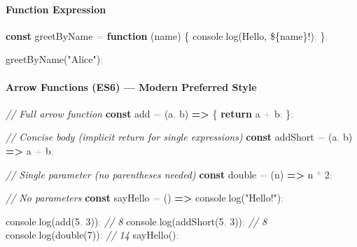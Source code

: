 \documentclass[
  justified,
  openright,
]{tufte-book}
\let\subsection\paragraph
\let\paragraph\paragraph
\newcommand{\KeywordTok}[1]{\textcolor{CodeKeyword}{\textbf{#1}}}  %
\newcommand{\StringTok}[1]{\textcolor{CodeString}{#1}}              %
\newcommand{\CommentTok}[1]{\textcolor{CodeComment}{\textit{#1}}}  %
\newcommand{\CodeNumTok}[1]{\textcolor{CodeNumber}{#1}}             %
\newcommand{\CodeFuncTok}[1]{\textcolor{CodeKeyword}{#1}}           %
\newcommand{\OperatorTok}[1]{\textcolor{DarkGray}{#1}}              %
\newenvironment{Shaded}{%
  \begin{mdframed}[style=TufteCode]%
}{%
  \end{mdframed}%
}
\let\subsection\paragraph
\let\paragraph\paragraph
\begin{document}
\subsection{Function Expression}\label{function-expression}

\begin{Shaded}
\begin{Highlighting}[]
\KeywordTok{const} greetByName \OperatorTok{=} \KeywordTok{function} (name) \{
  console\OperatorTok{.}\CodeFuncTok{log}(\StringTok{\textasciigrave{}Hello, }\StringTok{\$\{}name\StringTok{\}}\StringTok{!\textasciigrave{}})\OperatorTok{;}
\}\OperatorTok{;}
 
\CodeFuncTok{greetByName}(\StringTok{"Alice"})\OperatorTok{;}
\end{Highlighting}
\end{Shaded}

\subsection{Arrow Functions (ES6) --- Modern Preferred
Style}\label{arrow-functions-es6-modern-preferred-style}

\begin{Shaded}
\begin{Highlighting}[]
\CommentTok{// Full arrow function}
\KeywordTok{const} add \OperatorTok{=} (a\OperatorTok{,} b) \KeywordTok{=\textgreater{}} \{
  \KeywordTok{return} a \OperatorTok{+} b\OperatorTok{;}
\}\OperatorTok{;}
 
\CommentTok{// Concise body (implicit return for single expressions)}
\KeywordTok{const} addShort \OperatorTok{=} (a\OperatorTok{,} b) \KeywordTok{=\textgreater{}} a \OperatorTok{+} b\OperatorTok{;}
 
\CommentTok{// Single parameter (no parentheses needed)}
\KeywordTok{const} double \OperatorTok{=} (n) \KeywordTok{=\textgreater{}} n \OperatorTok{*} \CodeNumTok{2}\OperatorTok{;}
 
\CommentTok{// No parameters}
\KeywordTok{const} sayHello \OperatorTok{=} () \KeywordTok{=\textgreater{}} console\OperatorTok{.}\CodeFuncTok{log}(\StringTok{"Hello!"})\OperatorTok{;}
 
console\OperatorTok{.}\CodeFuncTok{log}(\CodeFuncTok{add}(\CodeNumTok{5}\OperatorTok{,} \CodeNumTok{3}))\OperatorTok{;} \CommentTok{// 8}
console\OperatorTok{.}\CodeFuncTok{log}(\CodeFuncTok{addShort}(\CodeNumTok{5}\OperatorTok{,} \CodeNumTok{3}))\OperatorTok{;} \CommentTok{// 8}
console\OperatorTok{.}\CodeFuncTok{log}(\CodeFuncTok{double}(\CodeNumTok{7}))\OperatorTok{;} \CommentTok{// 14}
\CodeFuncTok{sayHello}()\OperatorTok{;}
\end{Highlighting}
\end{Shaded}
\end{document}
